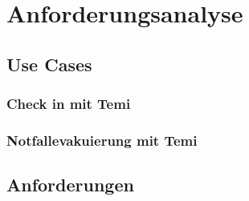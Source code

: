 \chapter{Anforderungsanalyse}
\section{Use Cases}
\subsection{Check in mit Temi}
\subsection{Notfallevakuierung mit Temi}
\section{Anforderungen}
